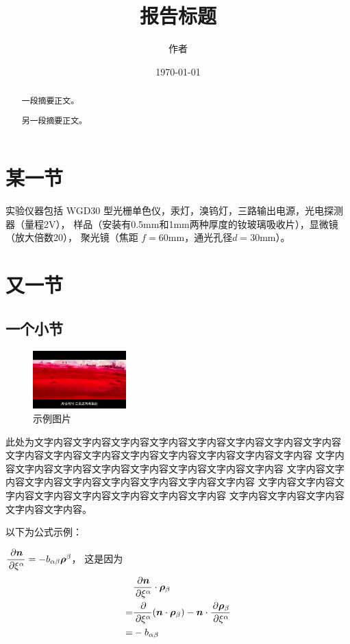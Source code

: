 \documentclass[]{myTemplate}
\title{报告标题}
\author{作者}
\affil{下北泽大学}
\date{\today}
\begin{document}
	\maketitle

	\begin{abstract}
		一段摘要正文。

		另一段摘要正文。
	\end{abstract}

	\section{某一节}\label{sec:1}
		实验仪器包括 WGD30 型光栅单色仪，汞灯，溴钨灯，三路输出电源，光电探测器（量程2\si{\volt}），
		样品（安装有0.5\si{\milli\metre}和1\si{\milli\metre}两种厚度的钕玻璃吸收片），显微镜（放大倍数20），
		聚光镜（焦距 $f = 60\si{\milli\metre}$，通光孔径$d = 30\si{\milli\metre}$）。

	\section{又一节}
	\subsection{一个小节}
		\begin{figure}
			\centering
			\includegraphics[width=0.32\textwidth]{sample.jpg}
			\caption{示例图片}\label{fig:1}
		\end{figure}

		此处为文字内容文字内容文字内容文字内容文字内容文字内容文字内容文字内容
		文字内容文字内容文字内容文字内容文字内容文字内容文字内容文字内容
		文字内容文字内容文字内容文字内容文字内容文字内容文字内容文字内容
		文字内容文字内容文字内容文字内容文字内容文字内容文字内容文字内容
		文字内容文字内容文字内容文字内容文字内容文字内容文字内容文字内容
		文字内容文字内容文字内容文字内容文字内容。

		以下为公式示例：
        
        $\Drivp{\bm{n}}{\xi^\alpha}=-b_{\alpha\beta}\bm{\rho}^\beta$，
		这是因为
		\begin{align*}
			&\drivp{\bm{n}}{\xi^\alpha}\cdot\bm{\rho}_\beta\\
			=&\drivp{}{\xi^\alpha}(\bm{n}\cdot\bm{\rho}_\beta) - \bm{n}\cdot\drivp{\bm{\rho}_\beta}{\xi^\alpha}\\
			=&-b_{\alpha\beta}
		\end{align*}
		
\end{document}
